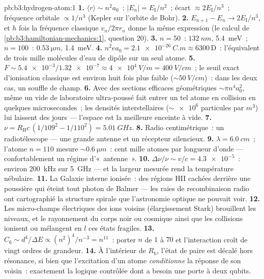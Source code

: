 \begin{solution}{pb:b3:hydrogen-atom:1}
\textbf{1.} $\langle r\rangle \sim n^2a_0$~; $|E_n| =
E_{\text{I}}/n^2$~; écart $\approx 2E_{\text{I}}/n^3$~; fréquence
orbitale $\propto 1/n^3$ (Kepler sur l'orbite de Bohr).
\textbf{2.} $E_{n+1} - E_n \to 2E_{\text{I}}/n^3$, et $h$ fois la
fréquence classique $v_n/2\pi r_n$ donne la même expression (le calcul
de \cref{pb:b3:hamiltonian-mechanics:1}, question 20).
\textbf{3.} $n = 50$~: $\qty{132}{nm}$, \qty{5.4}{meV}~; $n = 100$~:
$\qty{0.53}{\micro m}$, \qty{1.4}{meV}.
\textbf{4.} $n^2ea_0 = \qty{2.1e-26}{C.m} \approx 6300\,\text{D}$~:
l'équivalent de trois mille molécules d'eau de dipôle sur un seul atome.
\textbf{5.} $F \sim \num{5.4e-3}/\num{1.32e-7} \approx
\qty{4e4}{V/m} = \qty{400}{V/cm}$~; le seuil exact d'ionisation
classique est environ huit fois plus faible ($\sim\qty{50}{V/cm}$)~:
dans les deux cas, un souffle de champ.
\textbf{6.} Avec des sections efficaces géométriques
$\sim\pi n^4a_0^2$, même un vide de laboratoire ultra-poussé fait
entrer un tel atome en collision en quelques microsecondes~; les
densités interstellaires ($\sim\num{e6}$ particules par
$\unit{m^3}$) lui laissent des jours --- l'espace est la meilleure
enceinte à vide.
\textbf{7.} $\nu = R_{\text{H}}c\,(1/109^2 - 1/110^2) =
\qty{5.01}{GHz}$.
\textbf{8.} Radio centimétrique~: un radiotélescope --- une grande
antenne et un récepteur silencieux.
\textbf{9.} $\lambda = \qty{6.0}{cm}$~; l'atome $n = 110$ mesure
$\sim\qty{0.6}{\micro m}$~: cent mille atomes par longueur d'onde ---
confortablement un régime d'«~antenne~».
\textbf{10.} $\Delta\nu/\nu \sim v/c = \num{4.3e-5}$~: environ
\qty{200}{kHz} sur \qty{5}{GHz} --- et la largeur mesurée rend la
température nébulaire.
\textbf{11.} La Galaxie interne ionisée~: des régions HII cachées
derrière une poussière qui éteint tout photon de Balmer --- les raies
de recombinaison radio ont cartographié la structure spirale que
l'astronomie optique ne pouvait voir.
\textbf{12.} Les micro-champs électriques des ions voisins
(élargissement Stark) brouillent les niveaux, et le rayonnement du
corps noir ou cosmique ainsi que les collisions ionisent ou mélangent
en $l$ ces états fragiles.
\textbf{13.} $C_6 \sim d^4/\Delta E \propto (n^2)^4/n^{-3} =
n^{11}$~: porter $n$ de $1$ à $70$ et l'interaction croît de vingt
ordres de grandeur.
\textbf{14.} À l'intérieur de $R_{\text{b}}$, l'état de paire est
décalé hors résonance, si bien que l'excitation d'un atome
\emph{conditionne} la réponse de son voisin~: exactement la logique
contrôlée dont a besoin une porte à deux qubits.

\end{solution}
